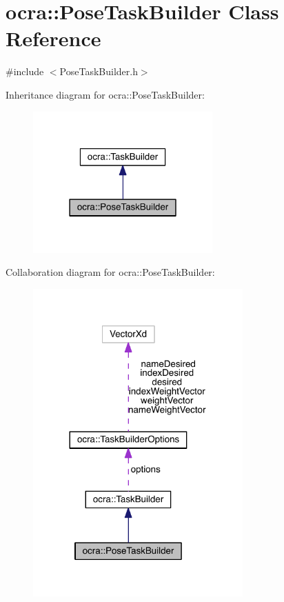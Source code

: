 \hypertarget{classocra_1_1PoseTaskBuilder}{}\section{ocra\+:\+:Pose\+Task\+Builder Class Reference}
\label{classocra_1_1PoseTaskBuilder}


{\ttfamily \#include $<$Pose\+Task\+Builder.\+h$>$}



Inheritance diagram for ocra\+:\+:Pose\+Task\+Builder\+:\nopagebreak
\begin{figure}[H]
\begin{center}
\leavevmode
\includegraphics[width=195pt]{da/d70/classocra_1_1PoseTaskBuilder__inherit__graph}
\end{center}
\end{figure}


Collaboration diagram for ocra\+:\+:Pose\+Task\+Builder\+:\nopagebreak
\begin{figure}[H]
\begin{center}
\leavevmode
\includegraphics[width=228pt]{d0/d22/classocra_1_1PoseTaskBuilder__coll__graph}
\end{center}
\end{figure}
